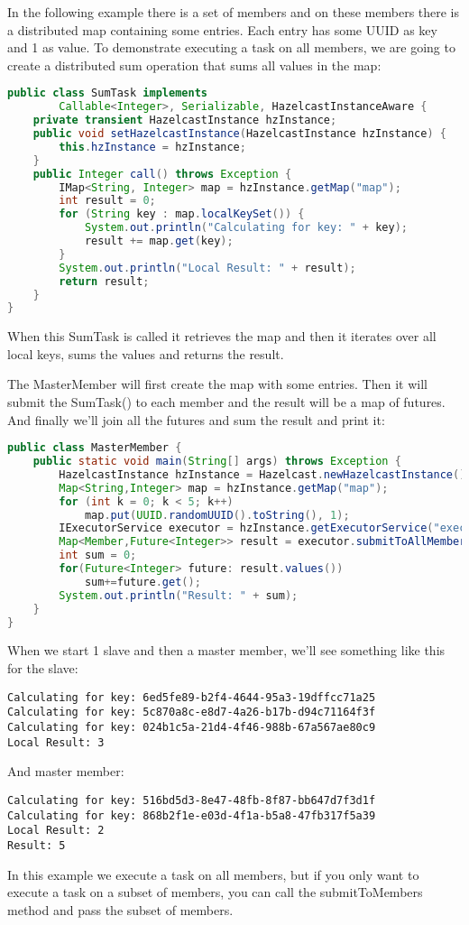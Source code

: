 In the following example there is a set of members and on these members there is a distributed map containing some entries. Each entry has some UUID as key and 1 as value. To demonstrate executing a task on all members, we are going to create a distributed sum operation that sums all values in the map:
\begin{lstlisting}[language=java]
public class SumTask implements
        Callable<Integer>, Serializable, HazelcastInstanceAware {
    private transient HazelcastInstance hzInstance;
    public void setHazelcastInstance(HazelcastInstance hzInstance) {
        this.hzInstance = hzInstance;
    }
    public Integer call() throws Exception {
        IMap<String, Integer> map = hzInstance.getMap("map");
        int result = 0;
        for (String key : map.localKeySet()) {
            System.out.println("Calculating for key: " + key);
            result += map.get(key);
        }
        System.out.println("Local Result: " + result);
        return result;
    }
}
\end{lstlisting}
When this SumTask is called it retrieves the map and then it iterates over all local keys, sums the values and returns the result.

The MasterMember will first create the map with some entries. Then it will submit the SumTask() to each member and the result will be a map of futures. And finally we'll join all the futures and sum the result and print it:
\begin{lstlisting}[language=java]
public class MasterMember {
    public static void main(String[] args) throws Exception {
        HazelcastInstance hzInstance = Hazelcast.newHazelcastInstance();
        Map<String,Integer> map = hzInstance.getMap("map");
        for (int k = 0; k < 5; k++)
            map.put(UUID.randomUUID().toString(), 1);
        IExecutorService executor = hzInstance.getExecutorService("executor");
        Map<Member,Future<Integer>> result = executor.submitToAllMembers (new SumTask());
        int sum = 0;
        for(Future<Integer> future: result.values())
            sum+=future.get();
        System.out.println("Result: " + sum);
    }
}

\end{lstlisting}
When we start 1 slave and then a master member, we'll see something like this for the slave:
\begin{lstlisting}
Calculating for key: 6ed5fe89-b2f4-4644-95a3-19dffcc71a25
Calculating for key: 5c870a8c-e8d7-4a26-b17b-d94c71164f3f
Calculating for key: 024b1c5a-21d4-4f46-988b-67a567ae80c9
Local Result: 3
\end{lstlisting}
And master member:
\begin{lstlisting}
Calculating for key: 516bd5d3-8e47-48fb-8f87-bb647d7f3d1f
Calculating for key: 868b2f1e-e03d-4f1a-b5a8-47fb317f5a39
Local Result: 2
Result: 5
\end{lstlisting}
In this example we execute a task on all members, but if you only want to execute a task on a subset of members, you can call the submitToMembers method and pass the subset of members.

